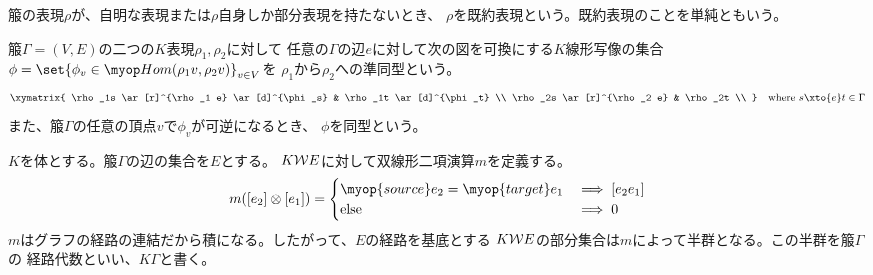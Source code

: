 	\begin{definition}[箙の既約表現]\label{def:箙の既約表現} %
		箙の表現$\rho$が、自明な表現または$\rho$自身しか部分表現を持たないとき、
		$\rho$を既約表現という。既約表現のことを単純ともいう。
	\end{definition} %

	\begin{definition}\label{def:箙の表現の準同型} %
		箙$\Gamma=(V,E)$の二つの$K$表現$\rho_1,\rho_2$に対して
		任意の$\Gamma$の辺$e$に対して次の図を可換にする$K$線形写像の集合
		$\phi=\set{\phi_v\in\Hom(\rho_1v,\rho_2v)}_{v\in V}$を
		$\rho_1$から$\rho_2$への準同型という。
		\begin{equation*}\xymatrix{
			\rho_1s \ar[r]^{\rho_1 e} \ar[d]^{\phi_s} & \rho_1t \ar[d]^{\phi_t} \\
			\rho_2s \ar[r]^{\rho_2 e} & \rho_2t \\
		} \quad\text{where }s\xto{e}t\in\Gamma
		\end{equation*}
		また、箙$\Gamma$の任意の頂点$v$で$\phi_v$が可逆になるとき、
		$\phi$を同型という。
	\end{definition} %

	\begin{definition}[箙の経路代数]\label{def:箙の経路代数} %
		$K$を体とする。箙$\Gamma$の辺の集合を$E$とする。
		$K\mathcal{W} E$に対して双線形二項演算$m$を定義する。
		\begin{equation*}\begin{split} %
			m(\word{e_2}\otimes\word{e_1}) = \begin{cases}
				\myop{source}e_2 = \myop{target}e_1 &\implies \word{e_2e_1} \\
				\text{else} &\implies 0 \\
			\end{cases}
		\end{split}\end{equation*} %
		$m$はグラフの経路の連結だから積になる。したがって、$E$の経路を基底とする
		$K\mathcal{W} E$の部分集合は$m$によって半群となる。この半群を箙$\Gamma$の
		経路代数といい、$K\Gamma$と書く。
	\end{definition} %

